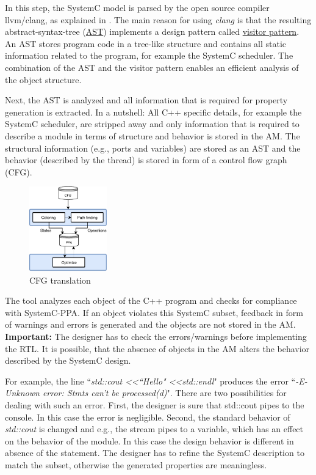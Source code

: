 In this step, the SystemC model is parsed by the open source compiler llvm/clang, as explained in \cite{2013-KaushikPatel}.
The main reason for using \textit{clang} is that the resulting abstract-syntax-tree (\href{https://en.wikipedia.org/wiki/Abstract_syntax_tree}{AST}) implements a design pattern called \href{https://en.wikipedia.org/wiki/Visitor_pattern}{visitor pattern}. 
An AST stores program code in a tree-like structure and contains all static information related to the program, for example the SystemC scheduler.
The combination of the AST and the visitor pattern enables an efficient analysis of the object structure.

Next, the AST is analyzed and all information that is required for property generation is extracted. 
In a nutshell: All C++ specific details, for example the SystemC scheduler, are stripped away and only information that is required to describe a module in terms of structure and behavior is stored in the AM. 
The structural information (e.g., ports and variables) are stored as an AST and the behavior (described by the thread) is stored in form of a control flow graph (CFG). 

\begin{figure}
	\vspace{-10pt}
    \caption{CFG translation}
    \label{fig:step2-detail}
    \includegraphics[width=0.3\textwidth]{fig/step2_detail}
    \vspace{-20pt}
\end{figure}

The tool analyzes each object of the C++ program and checks for compliance with SystemC-PPA. 
If an object violates this SystemC subset, feedback in form of warnings and errors is generated and the objects are not stored in the AM.
\textbf{Important:} The designer has to check the errors/warnings before implementing the RTL.
It is possible, that the absence of objects in the AM alters the behavior described by the SystemC design. 

For example, the line ``\textit{std::cout \textless\textless ``Hello" \textless\textless std::endl}" produces the error ``\textit{-E- Unknown error: Stmts can't be processed(d)}". 
There are two possibilities for dealing with such an error. 
First, the designer is sure that std::cout pipes to the console. 
In this case the error is negligible. 
Second, the standard behavior of \textit{std::cout} is changed and e.g., the stream pipes to a variable, which has an effect on the behavior of the module. 
In this case the design behavior is different in absence of the statement. 
The designer has to refine the SystemC description to match the subset, otherwise the generated properties are meaningless. 

